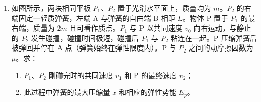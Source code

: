 \documentclass[\gkver]{gaokaozhenti}
\begin{document}
\begin{enumerate}
{\begin{enumerate}
	\item
	$\frac{(s_{4}+s_{5}+s_{6})-(s_{1}+s_{2}+s_{3})}{9T^{2}}$

	\item
	见解析（实物连线如图所示）


	\item
	0.1

	\item
	$\frac{LU}{I}$，6.0（描点连线图线如图所示）


\end{enumerate}
}

\item
如图所示，两块相同平板 $P_{1}$、$P_{2}$ 置于光滑水平面上，质量均为 $m$。$P_{2}$ 的右端固定一轻质弹簧，左端 A 与弹簧的自由端 B 相距 $L$。物体 P 置于 $P_{1}$ 的最右端，质量为 $2m$ 且可看作质点。$P_{1}$ 与 P 以共同速度 $v_{0}$ 向右运动，与静止的 $P_{2}$ 发生碰撞，碰撞时间极短，碰撞后 $P_{1}$ 与 $P_{2}$ 粘连在一起。P 压缩弹簧后被弹回并停在 A 点（弹簧始终在弹性限度内）。P 与 $P_{2}$ 之间的动摩擦因数为 $\mu$。求：
\begin{enumerate}
	\item
	$P_{1}$、$P_{2}$ 刚碰完时的共同速度 $v_{1}$ 和 P 的最终速度 $v_{2}$；
	\item
	此过程中弹簧的最大压缩量 $x$ 和相应的弹性势能 $E_{p}$。
\end{enumerate}


\end{enumerate}
\end{document}
